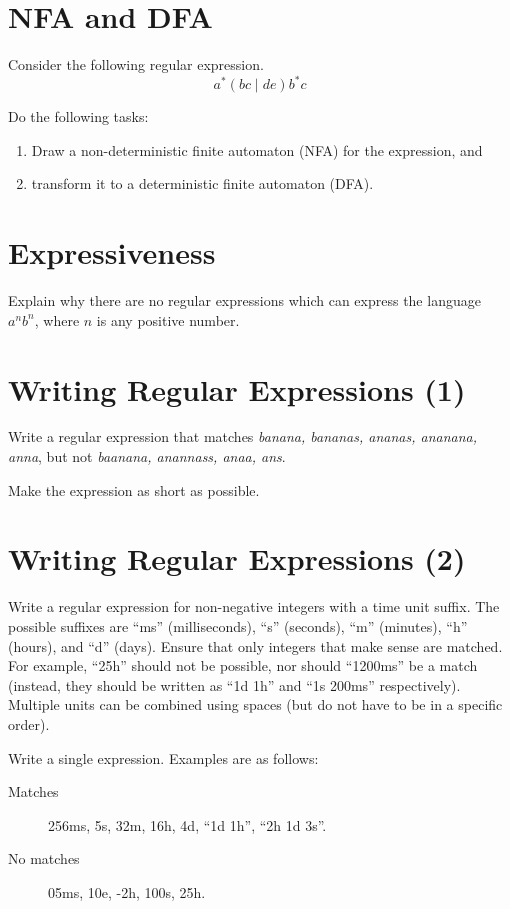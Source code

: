 
\subtitle{Assignment 2: Lexical Analysis}


\makefancytitle


\section{NFA and DFA}

Consider the following regular expression.
\[
  a^* \left( bc \mid de \right) b^*c
\]

Do the following tasks:
\begin{enumerate}
\item Draw a non-deterministic finite automaton (NFA) for the expression, and
\item transform it to a deterministic finite automaton (DFA).
\end{enumerate}


\section{Expressiveness}

Explain why there are no regular expressions which can express the language $a^n b^n$, where $n$ is any positive number.


\section{Writing Regular Expressions (1)}

Write a regular expression that matches \emph{banana, bananas, ananas, ananana, anna}, but not \emph{baanana, anannass, anaa, ans}.

Make the expression as short as possible. 


\section{Writing Regular Expressions (2)}

Write a regular expression for non-negative integers with a time unit suffix.
The possible suffixes are \enquote{ms} (milliseconds), \enquote{s} (seconds), \enquote{m} (minutes), \enquote{h} (hours), and \enquote{d} (days).
Ensure that only integers that make sense are matched.
For example, \enquote{25h} should not be possible, nor should \enquote{1200ms} be a match (instead, they should be written as \enquote{1d 1h} and \enquote{1s 200ms} respectively).
Multiple units can be combined using spaces (but do not have to be in a specific order).

Write a single expression. Examples are as follows:

\begin{description}
\item[Matches] 256ms, 5s, 32m, 16h, 4d, \enquote{1d 1h}, \enquote{2h 1d 3s}.
\item[No matches] 05ms, 10e, -2h, 100s, 25h.
\end{description}


